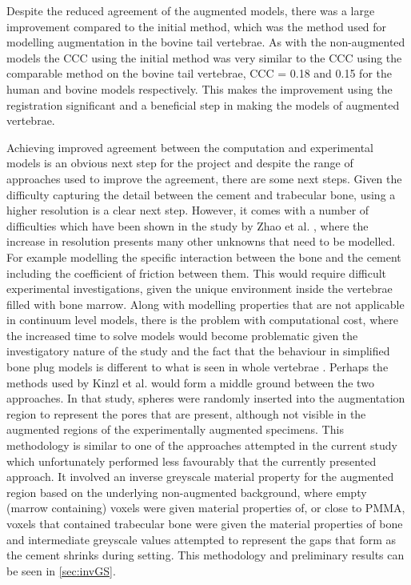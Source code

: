 Despite the reduced agreement of the augmented models, there was a large
improvement compared to the initial method, which was the method used for
modelling augmentation in the bovine tail vertebrae.  As with the non-augmented
models the CCC using the initial method was very similar to the CCC using the
comparable method on the bovine tail vertebrae, CCC = 0.18 and 0.15 for the
human and bovine models respectively.  This makes the improvement using the
registration significant and a beneficial step in making the models of
augmented vertebrae.

Achieving improved agreement between the computation and experimental models is
an obvious next step for the project and despite the range of approaches used
to improve the agreement, there are some next steps.  Given the difficulty
capturing the detail between the cement and trabecular bone, using a higher
resolution is a clear next step.  However, it comes with a number of
difficulties which have been shown in the study by Zhao et al. \cite{Zhao2012},
where the increase in resolution presents many other unknowns that need to be
modelled.  For example modelling the specific interaction between the bone and
the cement including the  coefficient of friction between them.  This would
require difficult experimental investigations, given the unique environment
inside the vertebrae filled with bone marrow.  Along with modelling properties
that are not applicable in continuum level models, there is the problem with
computational cost, where the increased time to solve models would become
problematic given the investigatory nature of the study and the fact that the
behaviour in simplified bone plug models is different to what is seen in whole
vertebrae \cite{Sikora2013}. Perhaps the methods used by Kinzl et al.
\cite{kinzl2013experimentally} would form a middle ground between the two
approaches. In that study, spheres were randomly inserted into the
augmentation region to represent the pores that are present, although not
visible in the augmented regions of the experimentally augmented specimens.
This methodology is similar to one of the approaches attempted in the current
study which unfortunately performed less favourably that the currently
presented approach. It involved an inverse greyscale material property for the
augmented region based on the underlying non-augmented background, where empty
(marrow containing) voxels were given material properties of, or close to PMMA,
voxels that contained trabecular bone were given the material properties of
bone and intermediate greyscale values attempted to represent the gaps that
form as the cement shrinks during setting. This methodology and preliminary
results can be seen in \cref{sec:invGS}.

